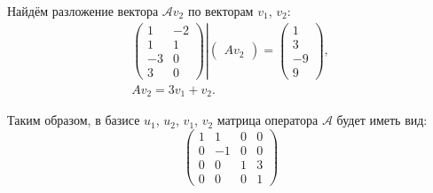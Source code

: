 \documentclass[12pt]{article}
\begin{document}
    Найдём разложение вектора $\mathcal{A} v_2$ по векторам $v_1$, $v_2$:
    \begin{gather*}
        \left .
        \begin{pmatrix}
            1  & -2 \\
            1  & 1  \\
            -3 & 0  \\
            3  & 0
        \end{pmatrix}
        \right |
        \begin{pmatrix}
            A v_2
        \end{pmatrix}
        =
        \begin{pmatrix}
            1  \\
            3  \\
            -9 \\
            9
        \end{pmatrix} , \\
        A v_2 = 3 v_1 + v_2 .
    \end{gather*}

    Таким образом, в базисе $u_1$, $u_2$, $v_1$, $v_2$ матрица оператора $\mathcal{A}$ будет иметь вид:
    \[
        \begin{pmatrix}
            1 & 1  & 0 & 0 \\
            0 & -1 & 0 & 0 \\
            0 & 0  & 1 & 3 \\
            0 & 0  & 0 & 1
        \end{pmatrix}
    \]
\end{document}
